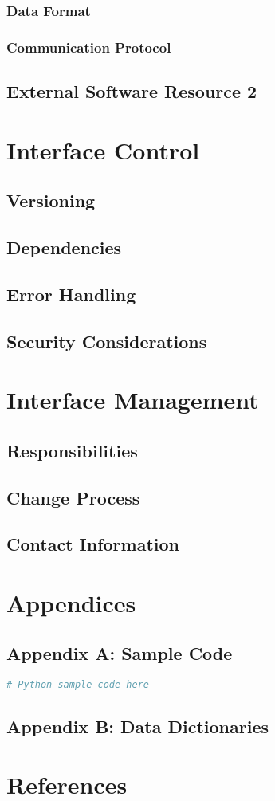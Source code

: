 \documentclass[11pt,a4paper,ngerman]{article}
\begin{document}
\subsubsection{Data Format}
\subsubsection{Communication Protocol}

\subsection{External Software Resource 2}

\section{Interface Control}
\subsection{Versioning}
\subsection{Dependencies}
\subsection{Error Handling}
\subsection{Security Considerations}

\section{Interface Management}
\subsection{Responsibilities}
\subsection{Change Process}
\subsection{Contact Information}

\section{Appendices}
\subsection{Appendix A: Sample Code}
\begin{lstlisting}[language=Python]
# Python sample code here
\end{lstlisting}
\subsection{Appendix B: Data Dictionaries}

\section{References}

\end{document}
